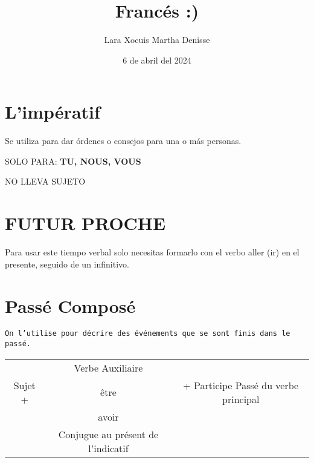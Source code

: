 \documentclass[letterpaper,12pt]{article}
\title {\textbf{Francés :)}}
\author{Lara Xocuis Martha Denisse}
\date{6 de abril del 2024}
\begin{document}
\maketitle
\thispagestyle{empty}
\newpage
\setcounter{page}{1}
\pagestyle{headings}

\begin{sloppypar} 
\section{L'impératif}
Se utiliza para dar órdenes o consejos para una o más personas.

SOLO PARA: \textbf{TU, NOUS, VOUS} 

NO LLEVA SUJETO

\section{FUTUR PROCHE}
Para usar este tiempo verbal solo necesitas formarlo con el verbo aller (ir) en el presente, seguido de un infinitivo.


\section{Passé Composé}
\texttt{On l'utilise pour décrire des événements que se sont finis dans le passé.}
\begin{center}
    \begin{tabular}{|c|c|c|}\hline
        & Verbe Auxiliaire & \\
        Sujet + & être & + Participe Passé du verbe principal\\
        & avoir & \\
        & Conjugue au présent de l'indicatif & \\
        \hline
    \end{tabular}
\end{center}


\end{sloppypar}
\end{document}
